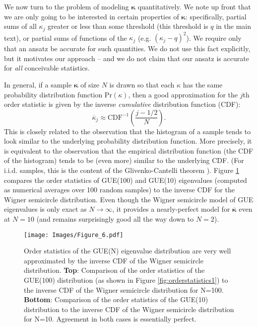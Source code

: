 \documentclass[aps,pra, twocolumn]{revtex4}
\newcommand{\bvec}[1]{\boldsymbol{#1}}
\begin{document}
We now turn to the problem of modeling $\bvec{\kappa}$ quantitatively.  We note up front that we are only going to be interested in certain properties of $\bvec{\kappa}$:  specifically, partial sums of all $\kappa_j$ greater or less than some threshold (this threshold is $q$ in the main text), or partial sums of functions of the $\kappa_j$ (e.g. $(\kappa_j-q)^2$).  We require only that an ansatz be accurate for such quantities.  We do not use this fact explicitly, but it motivates our approach -- and we do not claim that our ansatz is accurate for \emph{all} conceivable statistics.

In general, if a sample $\bvec{\kappa}$ of size $N$ is drawn so that each $\kappa$ has the same probability distribution 
function $\mathrm{Pr}(\kappa)$, then a good approximation for the $j$th order statistic is given by the inverse 
\emph{cumulative} distribution function (CDF):
\begin{equation}
\overline{\kappa}_j \approx \mathrm{CDF}^{-1}\left(\frac{j-1/2}{N}\right).
\end{equation}
This is closely related to the observation that the histogram of a sample tends to look similar to the underlying probability distribution function.  More precisely, it is equivalent to the observation that the empirical distribution function (the CDF of the histogram) tends to be (even more) similar to the underlying CDF.  (For i.i.d. samples, this is the content of the Glivenko-Cantelli theorem \cite{VanderVaart2000}).  Figure \ref{fig:orderstatistics2} compares the order statistics of GUE(100) and GUE(10) eigenvalues (computed as numerical averages over 100 random samples) to the inverse CDF for the Wigner semicircle distribution.  Even though the Wigner semicircle model of GUE eigenvalues is only exact as $N\to\infty$, it provides a nearly-perfect model for $\overline{\bvec{\kappa}}$ even at $N=10$ (and remains surprisingly good all the way down to $N=2$).

\begin{figure}[h!]
\texttt{[image: Images/Figure\_6.pdf]}
\caption{Order statistics of the GUE(N) eigenvalue distribution are very well approximated by the inverse CDF of the Wigner semicircle distribution.  \textbf{Top}:  Comparison of the order statistics of the GUE(100) distribution (as shown in Figure \ref{fig:orderstatistics1}) to the inverse CDF of the Wigner semicircle distribution for N=100.  \textbf{Bottom}:  Comparison of the order statistics of the GUE(10) distribution to the inverse CDF of the Wigner semicircle distribution for N=10.  Agreement in both cases is essentially perfect.}
\label{fig:orderstatistics2}
\end{figure}
\end{document}
